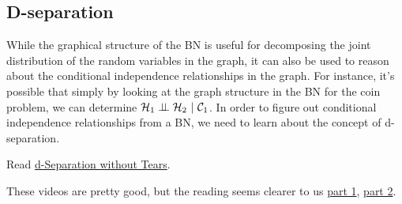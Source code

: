 \documentclass[assignment02_Solutions]{subfiles}
\begin{document}
\subsection{D-separation}
While the graphical structure of the BN is useful for decomposing the joint distribution of the random variables in the graph, it can also be used to reason about the conditional independence relationships in the graph.  For instance, it's possible that simply by looking at the graph structure in the BN for the coin problem, we can determine $\mathcal{H}_1 \perp\!\!\!\perp \mathcal{H}_2~|~\mathcal{C}_1$.  In order to figure out conditional independence relationships from a BN, we need to learn about the concept of d-separation.

\begin{externalresources}[(30 minutes)]
\bi
\item Read \href{http://www.dagitty.net/learn/dsep/index.html}{d-Separation without Tears}.
\item These videos are pretty good, but the reading seems clearer to us \href{https://www.youtube.com/watch?v=IjoWqnH6HmU}{part 1}, \href{https://www.youtube.com/watch?v=zJIK5uOyJi0}{part 2}.
\ei
\end{externalresources}
\end{document}
